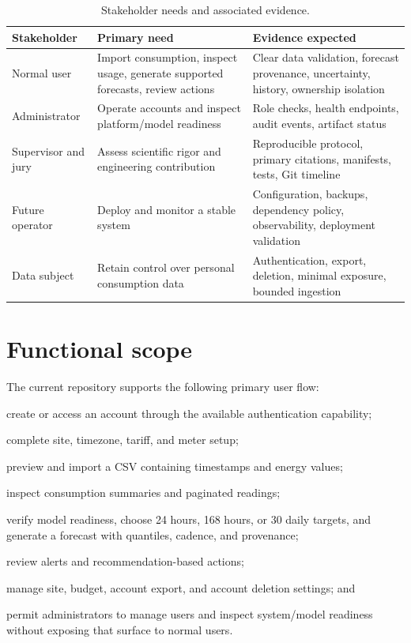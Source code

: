 \begin{table}[H]
\centering
\caption{Stakeholder needs and associated evidence.}
\label{tab:stakeholders}
\begin{tabularx}{\textwidth}{p{}YY}
\toprule
Stakeholder & Primary need & Evidence expected \\
\midrule
Normal user & Import consumption, inspect usage, generate supported forecasts, review actions & Clear data validation, forecast provenance, uncertainty, history, ownership isolation \\
Administrator & Operate accounts and inspect platform/model readiness & Role checks, health endpoints, audit events, artifact status \\
Supervisor and jury & Assess scientific rigor and engineering contribution & Reproducible protocol, primary citations, manifests, tests, Git timeline \\
Future operator & Deploy and monitor a stable system & Configuration, backups, dependency policy, observability, deployment validation \\
Data subject & Retain control over personal consumption data & Authentication, export, deletion, minimal exposure, bounded ingestion \\
\bottomrule
\end{tabularx}
\end{table}

\section{Functional scope}

The current repository supports the following primary user flow:
\begin{description}[style=multiline,leftmargin=1.8cm,labelwidth=1.4cm]
  \item[\textbf{FR-01}] create or access an account through the available authentication capability;
  \item[\textbf{FR-02}] complete site, timezone, tariff, and meter setup;
  \item[\textbf{FR-03}] preview and import a CSV containing timestamps and energy values;
  \item[\textbf{FR-04}] inspect consumption summaries and paginated readings;
  \item[\textbf{FR-05}] verify model readiness, choose 24 hours, 168 hours, or 30 daily targets, and generate a forecast with quantiles, cadence, and provenance;
  \item[\textbf{FR-06}] review alerts and recommendation-based actions;
  \item[\textbf{FR-07}] manage site, budget, account export, and account deletion settings; and
  \item[\textbf{FR-08}] permit administrators to manage users and inspect system/model readiness without exposing that surface to normal users.
\end{description}

